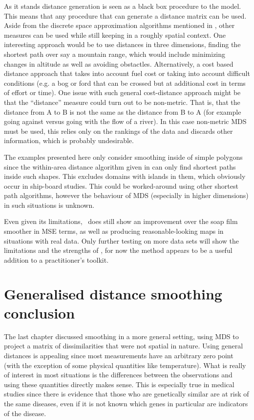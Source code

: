 As it stands distance generation is seen as a black box procedure to the model. This means that any procedure that can generate a distance matrix can be used. Aside from the discrete space approximation algorithms mentioned in , other measures can be used while still keeping in a roughly spatial context. One interesting approach would be to use distances in three dimensions, finding the shortest path over say a mountain range, which would include minimizing changes in altitude as well as avoiding obstactles. Alternatively, a cost based distance approach that takes into account fuel cost or taking into account difficult conditions (e.g. a bog or ford that can be crossed but at additional cost in terms of effort or time). One issue with such general cost-distance approach might be that the ``distance'' measure could turn out to be non-metric. That is, that the distance from A to B is not the same as the distance from B to A (for example going against versus going with the flow of a river). In this case non-metric MDS must be used, this relies only on the rankings of the data and discards other information, which is probably undesirable.

The examples presented here only consider smoothing inside of simple polygons since the within-area distance algorithm given in  can only find shortest paths inside such shapes. This excludes domains with islands in them, which obviously occur in ship-board studies. This could be worked-around using other shortest path algorithms, however the behaviour of MDS (especially in higher dimensions) in such situations is unknown.

Even given its limitations, \mdsds\ does still show an improvement over the soap film smoother in MSE terms, as well as producing reasonable-looking maps in situations with real data. Only further testing on more data sets will show the limitations and the strengths of \mdsds, for now the method appears to be a useful addition to a practitioner's toolkit.

\section{Generalised distance smoothing conclusion}
\label{fasend-gds-conc}

The last chapter discussed smoothing in a more general setting, using MDS to project a matrix of dissimilarities that were not spatial in nature. Using general distances is appealing since most measurements have an arbitrary zero point (with the exception of some physical quantities like temperature). What is really of interest in most situations is the differences between the observations and using these quantities directly makes sense. This is especially true in medical studies since there is evidence that those who are genetically similar are at risk of the same diseases, even if it is not known which genes in particular are indicators of the disease.

